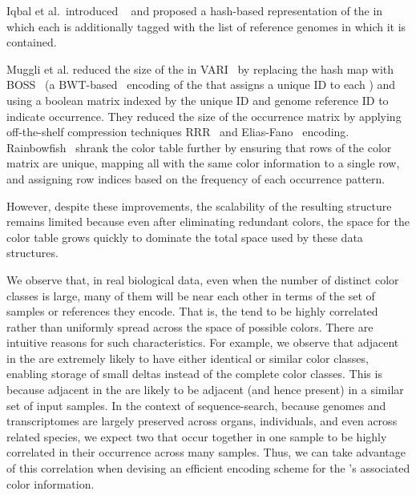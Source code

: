 Iqbal et al.\ introduced \cdbgs~\cite{IqbalCaTu12}
and proposed a hash-based representation of the \dbg in which each \kmer is
additionally tagged with the list of reference genomes in which it is contained.

Muggli et al. reduced the size of the \cdbg in VARI~\citep{MuggliBoNo17} by
replacing the hash map with BOSS~\cite{bowe2012succinct} (a BWT-based~\citep{bwt}
encoding of the \dbg that assigns a unique ID to each \kmer) and using a boolean
matrix indexed by the unique \kmer ID and genome reference ID to indicate
occurrence.  They reduced the size of the occurrence matrix by applying
off-the-shelf compression techniques RRR~\cite{RamanRaRa02} and
Elias-Fano~\citep{elias1974efficient} encoding.  Rainbowfish~\cite{rainbowfish}
shrank the color table further by ensuring that rows of the color matrix are
unique, mapping all \kmers with the same color information to a single row, and
assigning row indices based on the frequency of each occurrence pattern.

However, despite these improvements, the scalability of the resulting structure
remains limited because even after eliminating redundant colors, the space for
the color table grows quickly to dominate the total space used by these data
structures.

We observe that, in real biological data, even when the number of distinct color
classes is large, many of them will be near each other in terms of the set of
samples or references they encode. That is, the \ccs tend to be highly
correlated rather than uniformly spread across the space of possible colors.
There are intuitive reasons for such characteristics. For example, we observe
that adjacent \kmers in the \dbg are extremely likely to have either identical
or similar color classes, enabling storage of small deltas instead of the
complete color classes.  This is because \kmers adjacent in the \dbg are likely
to be adjacent (and hence present) in a similar set of input samples. In the
context of sequence-search, because genomes and transcriptomes are largely
preserved across organs, individuals, and even across related species, we expect
two \kmers that occur together in one sample to be highly correlated in their
occurrence across many samples. Thus, we can take advantage of
this correlation when devising an efficient encoding scheme for the \cdbg's
associated color information.


